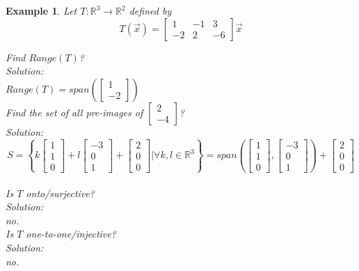 \documentclass[11pt]{article}
\newtheorem{ex}{Example}
\begin{document}
\begin{ex}
  Let $T: \mathbb{R}^{3} \to \mathbb{R}^{2}$ defined by
  \[T(\vec{x}) = \begin{bmatrix} 1  & -1 & 3 \\ -2 & 2 & -6 \end{bmatrix}\vec{x}\]

  Find $Range(T)$? \\
  Solution: \\
  $Range(T) = span(\begin{bmatrix} 1 \\ -2 \end{bmatrix})$\\
  Find the set of all pre-images of $\begin{bmatrix} 2 \\ -4 \end{bmatrix}$?\\
  Solution: \\
  \[S = \left\{ k\begin{bmatrix}1 \\ 1 \\ 0 \end{bmatrix} + l \begin{bmatrix} -3 \\ 0 \\ 1 \end{bmatrix}  + \begin{bmatrix} 2 \\ 0 \\ 0 \end{bmatrix} | \forall k,l \in \mathbb{R}^{3}\right\} = span\left(\begin{bmatrix} 1 \\ 1 \\ 0 \end{bmatrix}, \begin{bmatrix} -3 \\ 0 \\ 1 \end{bmatrix}\right) + \begin{bmatrix} 2 \\ 0 \\ 0 \end{bmatrix}\]\\
  Is $T$ onto/surjective? \\
  Solution: \\
  no.\\
  Is $T$ one-to-one/injective? \\
  Solution: \\
  no.

\end{ex}
\end{document}
